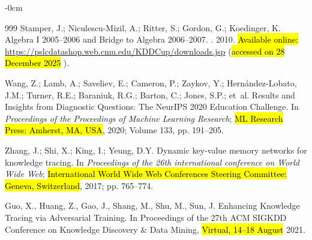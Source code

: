 \documentclass[applsci,article,accept,moreauthors,pdftex]{Definitions/mdpi}
\begin{document}
\begin{adjustwidth}{-\extralength}{0cm}
\begin{thebibliography}{999}
Stamper, J.; Niculescu-Mizil, A.; Ritter, S.; Gordon, G.; Koedinger, K.
\newblock Algebra I 2005--2006 and Bridge to Algebra 2006--2007.
. {2010}.
 \hl{Available online:} %
 \url{https://pslcdatashop.web.cmu.edu/KDDCup/downloads.jsp}  (\hl{accessed on 28 December 2025}%
).

Wang, Z.; Lamb, A.; Saveliev, E.; Cameron, P.; Zaykov, Y.;
  Hern{\'a}ndez-Lobato, J.M.; Turner, R.E.; Baraniuk, R.G.; Barton, C.; Jones,
  S.P.;  et~al.
\newblock Results and Insights from Diagnostic Questions: The NeurIPS 2020
  Education Challenge.
\newblock In \textit{Proceedings of the Proceedings of Machine Learning Research}; \hl{ML
  Research Press: Amherst, MA, USA},  2020; Volume 133, pp. 191--205.
\newblock 

Zhang, J.; Shi, X.; King, I.; Yeung, D.Y.
\newblock Dynamic key-value memory networks for knowledge tracing.
\newblock In \textit{Proceedings of the 26th international
  conference on World Wide Web}; \hl{International World Wide Web Conferences Steering Committee: Geneva, Switzerland},  2017; pp. 765--774.



Guo, X., Huang, Z., Gao, J., Shang, M., Shu, M., Sun, J. %
\newblock Enhancing Knowledge Tracing via Adversarial Training.
\newblock In Proceedings of the 27th ACM SIGKDD Conference
  on Knowledge Discovery \& Data Mining, \hl{Virtual, 14--18 August} 2021.


\end{thebibliography}
\end{adjustwidth}
\end{document}
